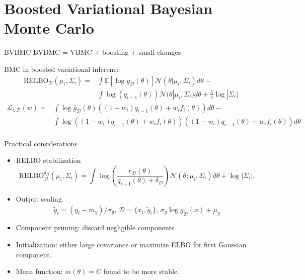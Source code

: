 \documentclass{beamer}
\def \Ev {{\mathbb E}}
\def \gu {{\bar{g}}}
\begin{document}
\section{Boosted Variational Bayesian Monte Carlo}
\begin{frame}{}
\begin{block}{BVBMC}
BVBMC = VBMC + boosting + small changes
\end{block}
\begin{block}{BMC in boosted variational inference}
\begin{equation*}
\begin{split}
\text{RELBO}_\mathcal{D}(\mu_i,\Sigma_i) = & \int \Ev[\log \gu_\mathcal{D}(\theta)] \mathcal{N}(\theta|\mu_i,\Sigma_i) d\theta - \\ &\int \log(q_{i-1}(\theta)) \mathcal{N}(\theta|\mu_i,\Sigma_i) d\theta
+ \frac{\lambda}{4} \log |\Sigma_i|
\end{split}
\end{equation*}
\begin{equation*}
\begin{split}
\mathcal{L}_{i,\mathcal{D}}(w) = & \int \log \gu_\mathcal{D}(\theta)
((1-w_{i}) q_{i-1}(\theta) + w_{i} f_{i}(\theta)) d\theta - \\
& \int \log ((1-w_{i}) q_{i-1}(\theta) + w_{i} f_{i}(\theta)) ((1-w_{i}) q_{i-1}(\theta) + w_{i} f_{i}(\theta)) d\theta \\
\end{split}
\end{equation*}
\end{block}
\end{frame}

\begin{frame}{}
\begin{block}{Practical considerations}
\begin{itemize}
\item RELBO stabilization
\begin{equation*}
\text{RELBO}^{\delta_D}_\mathcal{D}(\mu_i,\Sigma_i) = \int \log \left(\frac{r_\mathcal{D}(\theta)}{q_{i-1}(\theta)+\delta_D} \right) \mathcal{N}(\theta;\mu_i,\Sigma_i) d \theta + \log |\Sigma_i|.
\end{equation*}
\item Output scaling
\begin{equation*}
\tilde{y}_i = (y_i-m_y)/\sigma_y, \, \tilde{\mathcal{D}} = \{x_i,\tilde{y}_i\}, \,\sigma_y \log g_\mathcal{\tilde{D}}(x) + \mu_y
\end{equation*}
\item Component pruning: discard negligible components
\item Initialization: either large covariance or maximize ELBO for first Gaussian component.
\item Mean function: $m(\theta) = C$ found to be more stable.
\end{itemize}

\end{block}

\end{frame}
\end{document}
